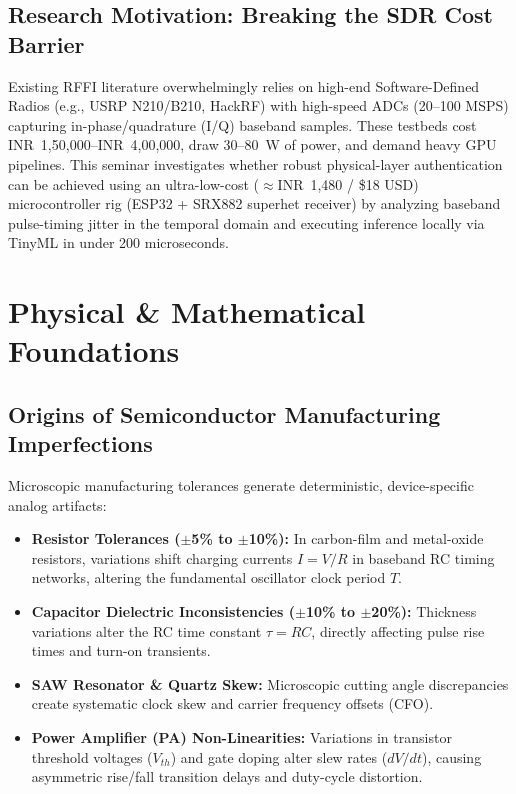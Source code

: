 \documentclass[11pt,a4paper]{article}
\begin{document}
\subsection{Research Motivation: Breaking the SDR Cost Barrier}
Existing RFFI literature overwhelmingly relies on high-end Software-Defined Radios (e.g., USRP N210/B210, HackRF) with high-speed ADCs (20--100 MSPS) capturing in-phase/quadrature (I/Q) baseband samples. These testbeds cost INR~1,50,000--INR~4,00,000, draw 30--80~W of power, and demand heavy GPU pipelines. This seminar investigates whether robust physical-layer authentication can be achieved using an ultra-low-cost ($\approx$INR~1,480 / \$18 USD) microcontroller rig (ESP32 + SRX882 superhet receiver) by analyzing baseband pulse-timing jitter in the temporal domain and executing inference locally via TinyML in under 200 microseconds.

\section{Physical \& Mathematical Foundations}
\subsection{Origins of Semiconductor Manufacturing Imperfections}
Microscopic manufacturing tolerances generate deterministic, device-specific analog artifacts:
\begin{itemize}\setlength\itemsep{0.1em}
    \item \textbf{Resistor Tolerances ($\pm$5\% to $\pm$10\%):} In carbon-film and metal-oxide resistors, variations shift charging currents $I = V/R$ in baseband RC timing networks, altering the fundamental oscillator clock period $T$.
    \item \textbf{Capacitor Dielectric Inconsistencies ($\pm$10\% to $\pm$20\%):} Thickness variations alter the RC time constant $\tau = RC$, directly affecting pulse rise times and turn-on transients.
    \item \textbf{SAW Resonator \& Quartz Skew:} Microscopic cutting angle discrepancies create systematic clock skew and carrier frequency offsets (CFO).
    \item \textbf{Power Amplifier (PA) Non-Linearities:} Variations in transistor threshold voltages ($V_{th}$) and gate doping alter slew rates ($dV/dt$), causing asymmetric rise/fall transition delays and duty-cycle distortion.
\end{itemize}
\end{document}
